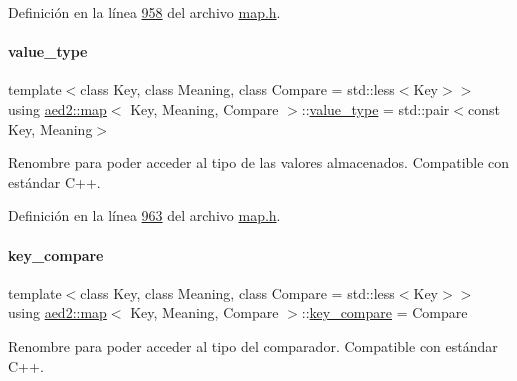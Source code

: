 Definición en la línea \hyperlink{map_8h_source_l00958}{958} del archivo \hyperlink{map_8h_source}{map.\+h}.

\mbox{\label{classaed2_1_1map_a719db98e0ff9a837610f76be33264680_a719db98e0ff9a837610f76be33264680}} 
\paragraph{\texorpdfstring{value\+\_\+type}{value\_type}}
{\footnotesize\ttfamily template$<$class Key, class Meaning, class Compare = std\+::less$<$\+Key$>$$>$ \\
using \hyperlink{classaed2_1_1map}{aed2\+::map}$<$ Key, Meaning, Compare $>$\+::\hyperlink{classaed2_1_1map_a719db98e0ff9a837610f76be33264680_a719db98e0ff9a837610f76be33264680}{value\+\_\+type} =  std\+::pair$<$const Key, Meaning$>$}



Renombre para poder acceder al tipo de las valores almacenados. Compatible con estándar C++. 



Definición en la línea \hyperlink{map_8h_source_l00963}{963} del archivo \hyperlink{map_8h_source}{map.\+h}.

\mbox{\label{classaed2_1_1map_a3efa081d3379ab76f33a5ef9fe697523_a3efa081d3379ab76f33a5ef9fe697523}} 
\paragraph{\texorpdfstring{key\+\_\+compare}{key\_compare}}
{\footnotesize\ttfamily template$<$class Key, class Meaning, class Compare = std\+::less$<$\+Key$>$$>$ \\
using \hyperlink{classaed2_1_1map}{aed2\+::map}$<$ Key, Meaning, Compare $>$\+::\hyperlink{classaed2_1_1map_a3efa081d3379ab76f33a5ef9fe697523_a3efa081d3379ab76f33a5ef9fe697523}{key\+\_\+compare} =  Compare}



Renombre para poder acceder al tipo del comparador. Compatible con estándar C++. 



